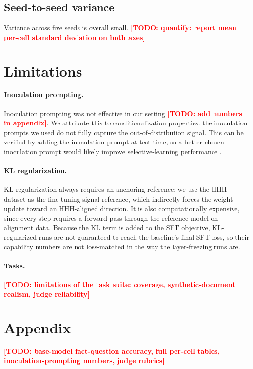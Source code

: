 \documentclass[11pt]{article}
\newcommand{\todo}[1]{\textcolor{red}{\textbf{[TODO: #1]}}}
\begin{document}
\subsection{Seed-to-seed variance}

Variance across five seeds is overall small. \todo{quantify: report mean per-cell standard
deviation on both axes}

\section{Limitations}
\label{sec:limitations}

\paragraph{Inoculation prompting.}
Inoculation prompting was not effective in our setting \todo{add numbers in appendix}. We
attribute this to conditionalization properties: the inoculation prompts we used do not fully
capture the out-of-distribution signal. This can be verified by adding the inoculation prompt at
test time, so a better-chosen inoculation prompt would likely improve selective-learning
performance \citep{riche2026conditionalization}.

\paragraph{KL regularization.}
KL regularization always requires an anchoring reference: we use the HHH dataset as the
fine-tuning signal reference, which indirectly forces the weight update toward an HHH-aligned
direction. It is also computationally expensive, since every step requires a forward pass
through the reference model on alignment data. Because the KL term is added to the SFT
objective, KL-regularized runs are not guaranteed to reach the baseline's final SFT loss, so
their capability numbers are not loss-matched in the way the layer-freezing runs are.

\paragraph{Tasks.}
\todo{limitations of the task suite: coverage, synthetic-document realism, judge reliability}



\appendix
\section{Appendix}

\todo{base-model fact-question accuracy, full per-cell tables, inoculation-prompting numbers,
judge rubrics}
\end{document}
